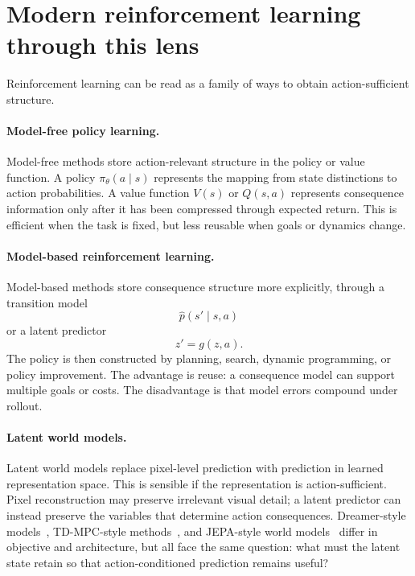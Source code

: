 \documentclass[11pt]{article}
\theoremstyle{remark}
\newcommand{\1}{\mathbb 1}
\begin{document}
\section{Modern reinforcement learning through this lens}

Reinforcement learning can be read as a family of ways to obtain action-sufficient structure.

\paragraph{Model-free policy learning.}
Model-free methods store action-relevant structure in the policy or value function. A policy $\pi_\theta(a\mid s)$ represents the mapping from state distinctions to action probabilities. A value function $V(s)$ or $Q(s,a)$ represents consequence information only after it has been compressed through expected return. This is efficient when the task is fixed, but less reusable when goals or dynamics change.

\paragraph{Model-based reinforcement learning.}
Model-based methods store consequence structure more explicitly, through a transition model
\begin{equation}
    \hat p(s'\mid s,a)
\end{equation}
or a latent predictor
\begin{equation}
    z' = g(z,a).
\end{equation}
The policy is then constructed by planning, search, dynamic programming, or policy improvement. The advantage is reuse: a consequence model can support multiple goals or costs. The disadvantage is that model errors compound under rollout.

\paragraph{Latent world models.}
Latent world models replace pixel-level prediction with prediction in learned representation space. This is sensible if the representation is action-sufficient. Pixel reconstruction may preserve irrelevant visual detail; a latent predictor can instead preserve the variables that determine action consequences. Dreamer-style models~\citep{Hafner-dream19,Hafner-dream20}, TD-MPC-style methods~\citep{Hansen-tdmpc22}, and JEPA-style world models~\citep{LeCun-path22} differ in objective and architecture, but all face the same question: what must the latent state retain so that action-conditioned prediction remains useful?
\end{document}
